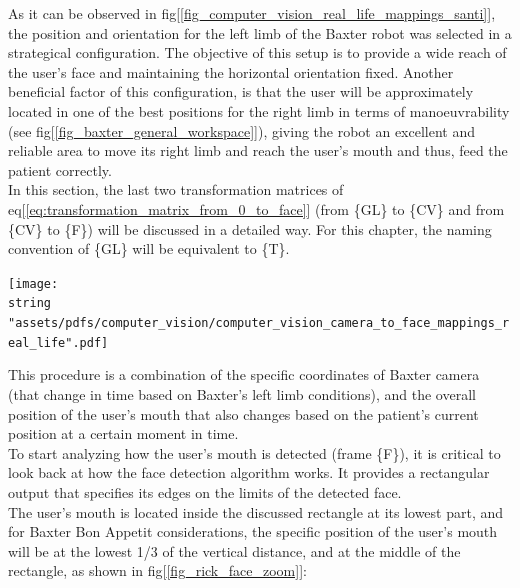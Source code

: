 \documentclass[11pt]{report} %
\begin{document}
As it can be observed in fig[\ref{fig_computer_vision_real_life_mappings_santi}], the position and orientation for the left limb of the Baxter robot was selected in a strategical configuration. The objective of this setup is to provide a wide reach of the user's face and maintaining the horizontal orientation fixed. Another beneficial factor of this configuration, is that the user will be approximately located in one of the best positions for the right limb in terms of manoeuvrability (see fig[\ref{fig_baxter_general_workspace}]), giving the robot an excellent and reliable area to move its right limb and reach the user's mouth and thus, feed the patient correctly.\\ 

In this section, the last two transformation matrices of eq[\ref{eq:transformation_matrix_from_0_to_face}] (from \{GL\} to \{CV\} and from \{CV\} to \{F\}) will be discussed in a detailed way. For this chapter, the naming convention of \{GL\} will be equivalent to \{T\}.\\

\begin{center}
\texttt{[image: \\string "assets/pdfs/computer\_vision/computer\_vision\_camera\_to\_face\_mappings\_real\_life".pdf]}
\bigbreak
\begin{minipage}{\linewidth} %
\label{fig_computer_vision_real_life_mappings_santi}
\end{minipage} \end{center}


This procedure is a combination of the specific coordinates of Baxter camera (that change in time based on Baxter's left limb conditions), and the overall position of the user's mouth that also changes based on the patient's current position at a certain moment in time.\\

To start analyzing how the user's mouth is detected (frame \{F\}), it is critical to look back at how the face detection algorithm works. It provides a rectangular output that specifies its edges on the limits of the detected face.\\


The user's mouth is located inside the discussed rectangle at its lowest part, and for Baxter Bon Appetit considerations, the specific position of the user's mouth will be at the lowest 1/3 of the vertical distance, and at the middle of the rectangle, as shown in fig[\ref{fig_rick_face_zoom}]:
\end{document}
